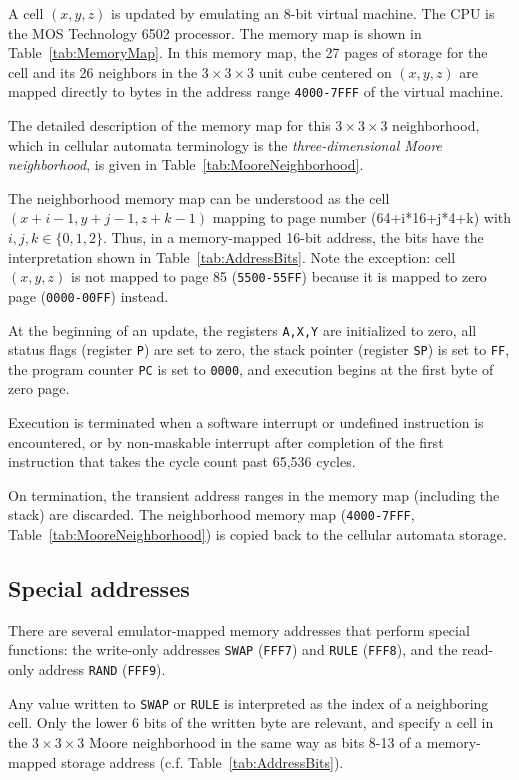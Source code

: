 \documentclass{article}
\newcommand\code[1]{{\tt #1}}
\newcommand\hex[1]{{\tt #1}}
\newcommand\hexrange[2]{\hex{#1}{\tt -}\hex{#2}}
\begin{document}
A cell $(x,y,z)$ is updated by emulating an 8-bit virtual machine.
The CPU is the MOS Technology 6502 processor.
The memory map is shown in Table~\ref{tab:MemoryMap}.
In this memory map, the 27 pages of storage
for the cell and its 26 neighbors
in the $3 \times 3 \times 3$ unit cube centered on $(x,y,z)$
are mapped directly to bytes in the address range \hexrange{4000}{7FFF} of the virtual machine.

The detailed description of the memory map for this $3 \times 3 \times 3$ neighborhood,
which in cellular automata terminology is
the {\em three-dimensional Moore neighborhood},
is given in Table~\ref{tab:MooreNeighborhood}.

The neighborhood memory map can be understood as the cell $(x+i-1,y+j-1,z+k-1)$
mapping to page number (64+i*16+j*4+k) with $i,j,k \in \{0,1,2\}$.
Thus, in a memory-mapped 16-bit address, the bits have the interpretation shown in Table~\ref{tab:AddressBits}.
Note the exception: cell $(x,y,z)$ is not mapped to page 85 (\hexrange{5500}{55FF})
because it is mapped to zero page (\hexrange{0000}{00FF}) instead.

At the beginning of an update,
the registers {\tt A,X,Y} are initialized to zero,
all status flags (register {\tt P}) are set to zero,
the stack pointer (register {\tt SP}) is set to \hex{FF},
the program counter {\tt PC} is set to \hex{0000},
and execution begins at the first byte of zero page.

Execution is terminated
when a software interrupt or undefined instruction is encountered,
or by non-maskable interrupt after
completion of the first instruction that takes the cycle count past 65,536 cycles.

On termination, the transient address ranges in the memory map
(including the stack)
are discarded.
The neighborhood memory map (\hexrange{4000}{7FFF}, Table~\ref{tab:MooreNeighborhood})
is copied back to the cellular automata storage.

\subsection{Special addresses}

There are several emulator-mapped memory addresses that perform special functions:
the write-only addresses \code{SWAP} (\hex{FFF7}) and \code{RULE} (\hex{FFF8}),
and the read-only address \code{RAND} (\hex{FFF9}).

Any value written to \code{SWAP} or \code{RULE} is interpreted as the index of a neighboring cell.
Only the lower 6 bits of the written byte are relevant, and specify a cell in the $3 \times 3 \times 3$ Moore neighborhood
in the same way as bits 8-13 of a memory-mapped storage address (c.f. Table~\ref{tab:AddressBits}).
\end{document}
